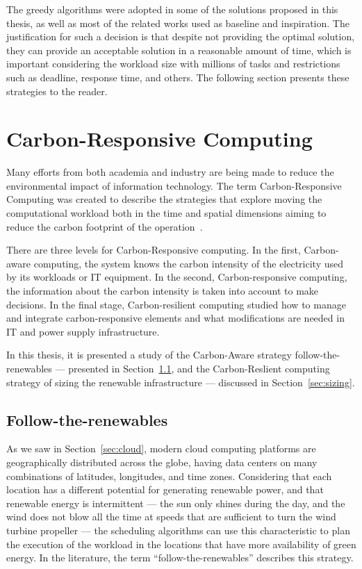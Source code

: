The greedy algorithms were adopted in some of the solutions proposed in this thesis, as well as most of the related works used as baseline and inspiration. The justification for such a decision is that despite not providing the optimal solution, they can provide an acceptable solution in a reasonable amount of time, which is important considering the workload size with millions of tasks and restrictions such as deadline, response time, and others. The following section presents these strategies to the reader.

\section{Carbon-Responsive Computing}

\label{sec:carbon_responsive}

Many efforts from both academia and industry are being made to reduce the environmental impact of information technology. The term Carbon-Responsive Computing was created to describe the strategies that explore moving the computational workload both in the time and spatial dimensions aiming to reduce the carbon footprint of the operation~\cite{schooler2021carbonaware}.


There are three levels for Carbon-Responsive computing. In the first, Carbon-aware computing, the system knows the carbon intensity of the electricity used by its workloads or IT equipment. In the second, Carbon-responsive computing, the information about the carbon intensity is taken into account to make decisions. In the final stage, Carbon-resilient computing studied how to manage and integrate carbon-responsive elements and what modifications are needed in IT and power supply infrastructure.

In this thesis, it is presented a study of the Carbon-Aware strategy follow-the-renewables --- presented in Section~\ref{sec:followtherenewables}, and the Carbon-Reslient computing strategy of sizing the renewable infrastructure --- discussed in Section~\ref{sec:sizing}.

\subsection{Follow-the-renewables}

\label{sec:followtherenewables}

As we saw in Section~\ref{sec:cloud}, modern cloud computing platforms are geographically distributed across the globe, having data centers on many combinations of latitudes, longitudes, and time zones. Considering that each location has a different potential for generating renewable power, and that renewable energy is intermittent --- the sun only shines during the day, and the wind does not blow all the time at speeds that are sufficient to turn the wind turbine propeller --- the scheduling algorithms can use this characteristic to plan the execution of the workload in the locations that have more availability of green energy. In the literature, the term ``follow-the-renewables'' \cite{shuja2016sustainable} describes this strategy. 


